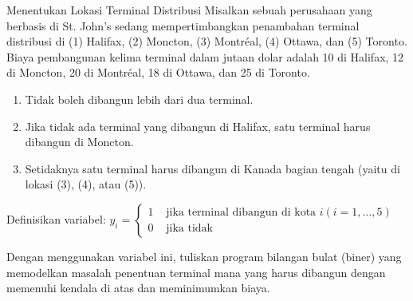 \begin{ex}{Menentukan Lokasi Terminal Distribusi}{}
\label{ex:terminals}
Misalkan sebuah perusahaan yang berbasis di St. John's sedang mempertimbangkan penambahan terminal distribusi di (1) Halifax, (2) Moncton, (3) Montréal, (4) Ottawa, dan (5) Toronto.\\

Biaya pembangunan kelima terminal dalam jutaan dolar adalah 10 di Halifax, 12 di Moncton, 20 di Montréal, 18 di Ottawa, dan 25 di Toronto.
\begin{enumerate}
\item Tidak boleh dibangun lebih dari dua terminal.
\item Jika tidak ada terminal yang dibangun di Halifax, satu terminal harus dibangun di Moncton.
\item Setidaknya satu terminal harus dibangun di Kanada bagian tengah (yaitu di lokasi (3), (4), atau (5)).
\end{enumerate}

Definisikan variabel:
$y_{i}= \begin{cases}1 & \text { jika terminal dibangun di kota } i(i=1, \ldots, 5) \\ 0 & \text { jika tidak}\end{cases}$

Dengan menggunakan variabel ini, tuliskan program bilangan bulat (biner) yang memodelkan masalah penentuan terminal mana yang harus dibangun dengan memenuhi kendala di atas dan meminimumkan biaya.
\exrefs{\S\ref{sec:capital-budgeting}, \S\ref{sec:modeling-tricks}}
\end{ex}

